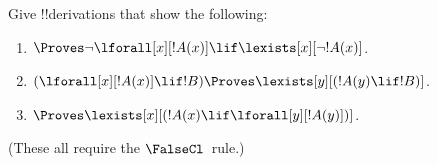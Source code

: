\documentclass[../../../include/open-logic-section]{subfiles}
\begin{document}
\begin{prob}
Give !!{derivation}s that show the following:
\begin{enumerate}
\item $\Proves \lnot\lforall[x][!A(x)] \lif \lexists[x][\lnot!A(x)]$.
\item $(\lforall[x][!A(x)] \lif !B) \Proves \lexists[y][(!A(y) \lif !B)]$.
\item $\Proves \lexists[x][(!A(x) \lif \lforall[y][!A(y)])]$.
\end{enumerate}
(These all require the $\FalseCl$~rule.)
\end{prob}
\end{document}
